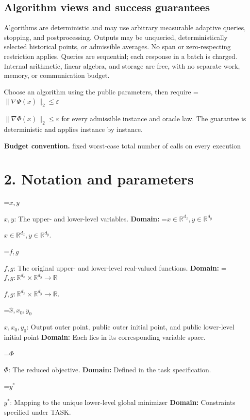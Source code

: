 \documentclass[10pt,a4paper]{article}
\newcommand{\AtlasMath}[1]{\par\begingroup\centering\setbox0=\hbox{$\displaystyle #1$}\ifdim\wd0>1.4\linewidth\typeout{ATLAS WIDE FORMULA: \the\wd0}\fi\ifdim\wd0>\linewidth\resizebox{\linewidth}{!}{\box0}\else\box0\fi\par\endgroup}
\newcommand{\AtlasInlineMath}[1]{\begingroup\setbox0=\hbox{$#1$}\ifdim\wd0>.4\linewidth\endgroup\AtlasMath{#1}\else\endgroup$#1$\fi}
\begin{document}
\subsection{Algorithm views and success guarantees}


Algorithms are deterministic and may use arbitrary measurable adaptive queries, stopping, and postprocessing. Outputs may be unqueried, deterministically selected historical points, or admissible averages. No span or zero-respecting restriction applies. Queries are sequential; each response in a batch is charged. Internal arithmetic, linear algebra, and storage are free, with no separate work, memory, or communication budget.



Choose an algorithm using the public parameters, then require \AtlasInlineMath{\|\nabla\Phi(\widehat{x})\|_2\le\varepsilon} for every admissible instance and oracle law. The guarantee is deterministic and applies instance by instance.



\textbf{Budget convention.} fixed worst-case total number of calls on every execution



\section{2. Notation and parameters}


\AtlasInlineMath{x,y}: The upper- and lower-level variables. \textbf{Domain:} \AtlasInlineMath{x\in\mathbb R^{d_x},y\in\mathbb R^{d_y}}.



\AtlasInlineMath{f,g}: The original upper- and lower-level real-valued functions. \textbf{Domain:} \AtlasInlineMath{f,g:\mathbb R^{d_x}\times\mathbb R^{d_y}\to\mathbb R}.



\AtlasInlineMath{\widehat x,x_0,y_0}: Output outer point, public outer initial point, and public lower-level initial point \textbf{Domain:} Each lies in its corresponding variable space.



\AtlasInlineMath{\Phi}: The reduced objective. \textbf{Domain:} Defined in the task specification.



\AtlasInlineMath{y^*}: Mapping to the unique lower-level global minimizer \textbf{Domain:} Constraints specified under TASK.
\end{document}
